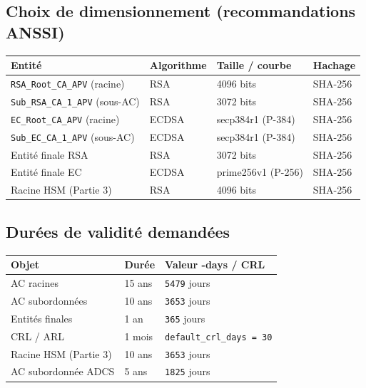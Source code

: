 \documentclass[11pt,a4paper]{article}
\newcommand{\tri}{\texttt{APV}}
\newcommand{\fichier}[1]{\texttt{#1}}
\newcommand{\cmdinline}[1]{\colorbox{outbg}{\ttfamily\small #1}}
\begin{document}
\subsection{Choix de dimensionnement (recommandations ANSSI)}

\begin{center}
\renewcommand{\arraystretch}{1.3}
\begin{tabular}{>{\raggedright}p{4.3cm} l l l}
\toprule
\textbf{Entité} & \textbf{Algorithme} & \textbf{Taille / courbe} & \textbf{Hachage}\\
\midrule
\fichier{RSA\_Root\_CA\_\tri} (racine)      & RSA   & 4096 bits     & SHA-256\\
\fichier{Sub\_RSA\_CA\_1\_\tri} (sous-AC)    & RSA   & 3072 bits     & SHA-256\\
\fichier{EC\_Root\_CA\_\tri} (racine)        & ECDSA & secp384r1 (P-384) & SHA-256\\
\fichier{Sub\_EC\_CA\_1\_\tri} (sous-AC)     & ECDSA & secp384r1 (P-384) & SHA-256\\
Entité finale RSA                            & RSA   & 3072 bits     & SHA-256\\
Entité finale EC                             & ECDSA & prime256v1 (P-256) & SHA-256\\
Racine HSM (Partie 3)                        & RSA   & 4096 bits     & SHA-256\\
\bottomrule
\end{tabular}
\end{center}

\subsection{Durées de validité demandées}
\begin{center}
\renewcommand{\arraystretch}{1.2}
\begin{tabular}{l l l}
\toprule
\textbf{Objet} & \textbf{Durée} & \textbf{Valeur \cmdinline{-days} / CRL}\\
\midrule
AC racines            & 15 ans  & \texttt{5479} jours\\
AC subordonnées       & 10 ans  & \texttt{3653} jours\\
Entités finales       & 1 an    & \texttt{365} jours\\
CRL / ARL             & 1 mois  & \texttt{default\_crl\_days = 30}\\
Racine HSM (Partie 3) & 10 ans  & \texttt{3653} jours\\
AC subordonnée ADCS   & 5 ans   & \texttt{1825} jours\\
\bottomrule
\end{tabular}
\end{center}
\end{document}
